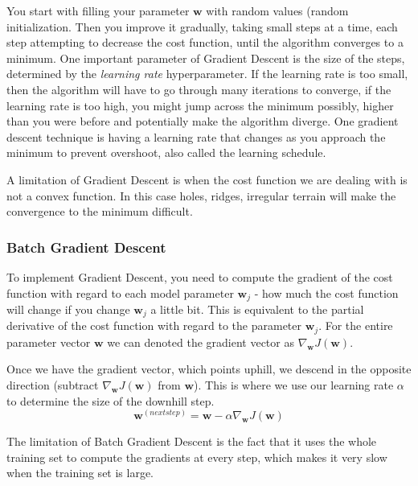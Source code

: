 \documentclass[12pt]{article}
\begin{document}
        You start with filling your parameter $\boldsymbol{w}$ with random values (random initialization. Then you improve it gradually, taking small steps at a time, each step attempting to decrease the cost function, until the algorithm converges
        to a minimum. One important parameter of Gradient Descent is the size of the steps, determined by the \textit{learning rate} hyperparameter. If the learning rate is too small, then the algorithm will have to go through many iterations to converge,
        if the learning rate is too high, you might jump across the minimum possibly, higher than you were before and potentially make the algorithm diverge. One gradient descent technique is having a learning rate that changes as you approach 
        the minimum to prevent overshoot, also called the learning schedule.

        A limitation of Gradient Descent is when the cost function we are dealing with is not a convex function. In this case holes, ridges, irregular terrain will make the convergence to the minimum difficult.

        \subsubsection{Batch Gradient Descent}
            To implement Gradient Descent, you need to compute the gradient of the cost function with regard to each model parameter $\boldsymbol{w}_j$ - how much the cost function will change if you change $\boldsymbol{w}_j$
            a little bit. This is equivalent to the partial derivative of the cost function with regard to the parameter $\boldsymbol{w}_j$. For the entire parameter vector $\boldsymbol{w}$ we can denoted the gradient vector as
            $\nabla_{\boldsymbol{w}} J(\boldsymbol{w})$.

            Once we have the gradient vector, which points uphill, we descend in the opposite direction (subtract $\nabla_{\boldsymbol{w}} J(\boldsymbol{w})$ from $\boldsymbol{w}$). This is where we use our learning rate $\alpha$ to determine the size of the
            downhill step.
            $$ \boldsymbol{w}^{(next step)} = \boldsymbol{w} - \alpha \nabla_{\boldsymbol{w}} J(\boldsymbol{w}) $$

            The limitation of Batch Gradient Descent is the fact that it uses the whole training set to compute the gradients at every step, which makes it very slow when the training set is large.
        
\end{document}
